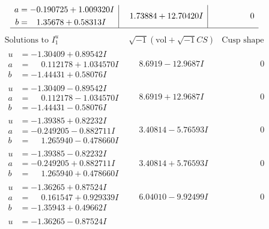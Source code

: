 \documentclass[1p]{elsarticle_modified}
\theoremstyle{definition}
\newcommand{\I}{\sqrt{-1}}
\begin{document}
$$\begin{array}{c|c|c}
\begin{aligned}
a &= -0.190725 + 1.009320 I \\
b &= \phantom{-}1.35678 + 0.58313 I\end{aligned}
 & \phantom{-}1.73884 + 12.70420 I & \phantom{-0.000000 } 0\\
 \hline 
 \end{array}$$\newpage$$\begin{array}{c|c|c}  
\text{Solutions to }I^u_{1}& \I (\text{vol} + \sqrt{-1}CS) & \text{Cusp shape}\\
 \hline 
\begin{aligned}
u &= -1.30409 + 0.89542 I \\
a &= \phantom{-}0.112178 + 1.034570 I \\
b &= -1.44431 + 0.58076 I\end{aligned}
 & \phantom{-}8.6919 - 12.9687 I & \phantom{-0.000000 } 0 \\ \hline\begin{aligned}
u &= -1.30409 - 0.89542 I \\
a &= \phantom{-}0.112178 - 1.034570 I \\
b &= -1.44431 - 0.58076 I\end{aligned}
 & \phantom{-}8.6919 + 12.9687 I & \phantom{-0.000000 } 0 \\ \hline\begin{aligned}
u &= -1.39385 + 0.82232 I \\
a &= -0.249205 - 0.882711 I \\
b &= \phantom{-}1.265940 - 0.478660 I\end{aligned}
 & \phantom{-}3.40814 - 5.76593 I & \phantom{-0.000000 } 0 \\ \hline\begin{aligned}
u &= -1.39385 - 0.82232 I \\
a &= -0.249205 + 0.882711 I \\
b &= \phantom{-}1.265940 + 0.478660 I\end{aligned}
 & \phantom{-}3.40814 + 5.76593 I & \phantom{-0.000000 } 0 \\ \hline\begin{aligned}
u &= -1.36265 + 0.87524 I \\
a &= \phantom{-}0.161547 + 0.929339 I \\
b &= -1.35943 + 0.49662 I\end{aligned}
 & \phantom{-}6.04010 - 9.92499 I & \phantom{-0.000000 } 0 \\ \hline\begin{aligned}
u &= -1.36265 - 0.87524 I \\

\end{aligned}
\end{array}$$
\end{document}
